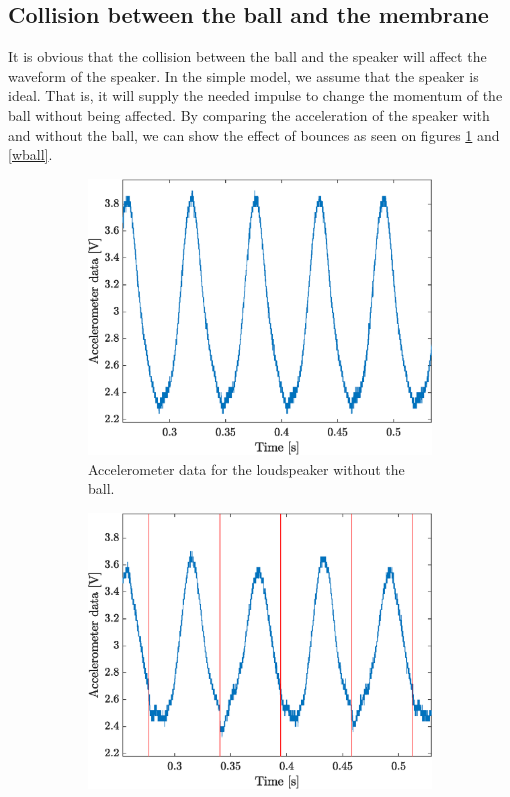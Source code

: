 \documentclass[12pt,oneside,a4paper]{article}
\numberwithin{equation}{section}
\begin{document}
{{{{\subsection{Collision between the ball and the membrane}
\label{ballmembrane}
It is obvious that the collision between the ball and the speaker will affect the waveform of the speaker. In the simple model, we assume that the speaker is ideal. That is, it will supply the needed impulse to change the momentum of the ball without being affected. By comparing the acceleration of the speaker with and without the ball, we can show the effect of bounces as seen on figures \ref{noball} and \ref{wball}. 
\begin{figure}[h]
\centering
\begin{subfigure}[t]{0.49\textwidth}
	\centering
	\includegraphics[width=\textwidth]{noball}
	\caption{Accelerometer data for the loudspeaker without the ball.}
	\label{noball}
\end{subfigure}\hfill
\begin{subfigure}[t]{0.49\textwidth}
	\centering
	\includegraphics[width=\textwidth]{wball}

\end{subfigure}
\end{figure}}}}}
\end{document}
